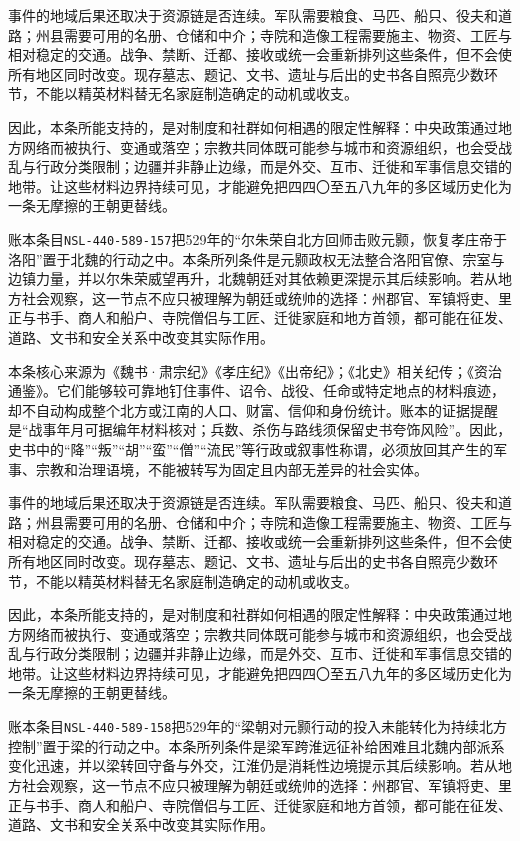 事件的地域后果还取决于资源链是否连续。军队需要粮食、马匹、船只、役夫和道路；州县需要可用的名册、仓储和中介；寺院和造像工程需要施主、物资、工匠与相对稳定的交通。战争、禁断、迁都、接收或统一会重新排列这些条件，但不会使所有地区同时改变。现存墓志、题记、文书、遗址与后出的史书各自照亮少数环节，不能以精英材料替无名家庭制造确定的动机或收支。

因此，本条所能支持的，是对制度和社群如何相遇的限定性解释：中央政策通过地方网络而被执行、变通或落空；宗教共同体既可能参与城市和资源组织，也会受战乱与行政分类限制；边疆并非静止边缘，而是外交、互市、迁徙和军事信息交错的地带。让这些材料边界持续可见，才能避免把四四〇至五八九年的多区域历史化为一条无摩擦的王朝更替线。

账本条目\texttt{NSL-440-589-157}把529年的“尔朱荣自北方回师击败元颢，恢复孝庄帝于洛阳”置于北魏的行动之中。本条所列条件是元颢政权无法整合洛阳官僚、宗室与边镇力量，并以尔朱荣威望再升，北魏朝廷对其依赖更深提示其后续影响。若从地方社会观察，这一节点不应只被理解为朝廷或统帅的选择：州郡官、军镇将吏、里正与书手、商人和船户、寺院僧侣与工匠、迁徙家庭和地方首领，都可能在征发、道路、文书和安全关系中改变其实际作用。

本条核心来源为《魏书·肃宗纪》《孝庄纪》《出帝纪》；《北史》相关纪传；《资治通鉴》。它们能够较可靠地钉住事件、诏令、战役、任命或特定地点的材料痕迹，却不自动构成整个北方或江南的人口、财富、信仰和身份统计。账本的证据提醒是“战事年月可据编年材料核对；兵数、杀伤与路线须保留史书夸饰风险”。因此，史书中的“降”“叛”“胡”“蛮”“僧”“流民”等行政或叙事性称谓，必须放回其产生的军事、宗教和治理语境，不能被转写为固定且内部无差异的社会实体。

事件的地域后果还取决于资源链是否连续。军队需要粮食、马匹、船只、役夫和道路；州县需要可用的名册、仓储和中介；寺院和造像工程需要施主、物资、工匠与相对稳定的交通。战争、禁断、迁都、接收或统一会重新排列这些条件，但不会使所有地区同时改变。现存墓志、题记、文书、遗址与后出的史书各自照亮少数环节，不能以精英材料替无名家庭制造确定的动机或收支。

因此，本条所能支持的，是对制度和社群如何相遇的限定性解释：中央政策通过地方网络而被执行、变通或落空；宗教共同体既可能参与城市和资源组织，也会受战乱与行政分类限制；边疆并非静止边缘，而是外交、互市、迁徙和军事信息交错的地带。让这些材料边界持续可见，才能避免把四四〇至五八九年的多区域历史化为一条无摩擦的王朝更替线。

账本条目\texttt{NSL-440-589-158}把529年的“梁朝对元颢行动的投入未能转化为持续北方控制”置于梁的行动之中。本条所列条件是梁军跨淮远征补给困难且北魏内部派系变化迅速，并以梁转回守备与外交，江淮仍是消耗性边境提示其后续影响。若从地方社会观察，这一节点不应只被理解为朝廷或统帅的选择：州郡官、军镇将吏、里正与书手、商人和船户、寺院僧侣与工匠、迁徙家庭和地方首领，都可能在征发、道路、文书和安全关系中改变其实际作用。

